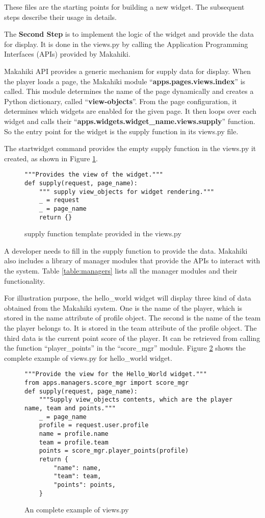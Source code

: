These files are the starting points for building a new widget. The subsequent steps describe their usage in details.

The {\bf Second Step} is to implement the logic of the widget and provide the data for display. It is done in the views.py by calling the Application Programming Interfaces (APIs) provided by Makahiki. 

Makahiki API provides a generic mechanism for supply data for display.  When the player loads a page, the Makahiki module ``{\bf apps.pages.views.index}'' is called. This module determines the name of the page dynamically and creates a Python dictionary, called ``{\bf view-objects}''.  From the page configuration, it determines which widgets are enabled for the given page. It then loops over each widget and calls their ``{\bf apps.widgets.widget\_name.views.supply}'' function. So the entry point for the widget is the supply function in its views.py file. 

The startwidget command provides the empty supply function in the views.py it created, as shown in Figure \ref{fig:views}. 
\begin{figure}[!ht]
\begin{lstlisting}
"""Provides the view of the widget."""
def supply(request, page_name):
    """ supply view_objects for widget rendering."""
    _ = request
    _ = page_name
    return {}
\end{lstlisting}
\caption{supply function template provided in the views.py}
\label{fig:views}
\end{figure}

A developer needs to fill in the supply function to provide the data. Makahiki also includes a library of manager modules that provide the APIs to interact with the system. Table \ref{table:managers} lists all the manager modules and their functionality. 

For illustration purpose, the hello\_world widget will display three kind of data obtained from the Makahiki system. One is the name of the player, which is stored in the name attribute of profile object. The second is the name of the team the player belongs to. It is stored in the team attribute of the profile object. The third data is the current point score of the player. It can be retrieved from calling the function ``player\_points'' in the ``score\_mgr'' module. Figure \ref{fig:views-example} shows the complete example of views.py for hello\_world widget.

\begin{figure}[!ht]
\begin{lstlisting}
"""Provide the view for the Hello_World widget."""
from apps.managers.score_mgr import score_mgr
def supply(request, page_name):
    """Supply view_objects contents, which are the player name, team and points."""
    _ = page_name
    profile = request.user.profile
    name = profile.name
    team = profile.team
    points = score_mgr.player_points(profile)
    return {
        "name": name,
        "team": team,
        "points": points,
    }
\end{lstlisting}
\caption{An complete example of views.py}
\label{fig:views-example}
\end{figure}

